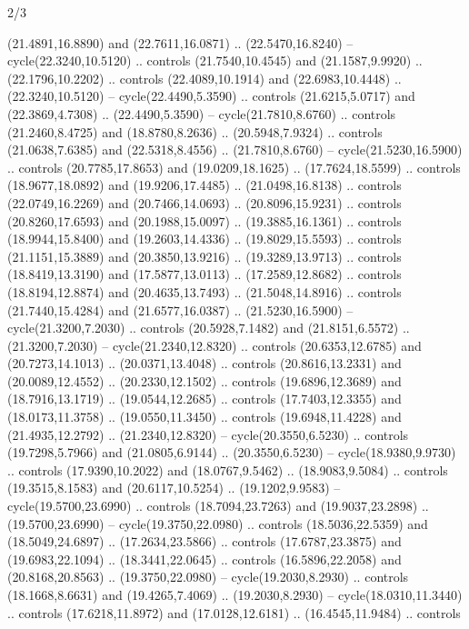 \begin{flagdescription}{2/3}
\begin{scope}[yshift=\flagwidth,scale=\flagwidth/1241.93737]
\begin{scope}[y=-1mm, x=1mm,draw=gold,fill=blue,line join=miter,miter limit=4,line width=1.8\lw]
\begin{scope}[y=1mm, x=1mm, yscale=-1,shift={(573.68mm+\str,145.75)}]
\begin{scope}[scale=1.35,shift={(-9,-3)}]
\begin{scope}[scale=0.55]
\begin{scope}[scale=1.333]
    (21.4891,16.8890) and (22.7611,16.0871) .. (22.5470,16.8240) --
    cycle(22.3240,10.5120) .. controls (21.7540,10.4545) and (21.1587,9.9920) ..
    (22.1796,10.2202) .. controls (22.4089,10.1914) and (22.6983,10.4448) ..
    (22.3240,10.5120) -- cycle(22.4490,5.3590) .. controls (21.6215,5.0717) and
    (22.3869,4.7308) .. (22.4490,5.3590) -- cycle(21.7810,8.6760) .. controls
    (21.2460,8.4725) and (18.8780,8.2636) .. (20.5948,7.9324) .. controls
    (21.0638,7.6385) and (22.5318,8.4556) .. (21.7810,8.6760) --
    cycle(21.5230,16.5900) .. controls (20.7785,17.8653) and (19.0209,18.1625) ..
    (17.7624,18.5599) .. controls (18.9677,18.0892) and (19.9206,17.4485) ..
    (21.0498,16.8138) .. controls (22.0749,16.2269) and (20.7466,14.0693) ..
    (20.8096,15.9231) .. controls (20.8260,17.6593) and (20.1988,15.0097) ..
    (19.3885,16.1361) .. controls (18.9944,15.8400) and (19.2603,14.4336) ..
    (19.8029,15.5593) .. controls (21.1151,15.3889) and (20.3850,13.9216) ..
    (19.3289,13.9713) .. controls (18.8419,13.3190) and (17.5877,13.0113) ..
    (17.2589,12.8682) .. controls (18.8194,12.8874) and (20.4635,13.7493) ..
    (21.5048,14.8916) .. controls (21.7440,15.4284) and (21.6577,16.0387) ..
    (21.5230,16.5900) -- cycle(21.3200,7.2030) .. controls (20.5928,7.1482) and
    (21.8151,6.5572) .. (21.3200,7.2030) -- cycle(21.2340,12.8320) .. controls
    (20.6353,12.6785) and (20.7273,14.1013) .. (20.0371,13.4048) .. controls
    (20.8616,13.2331) and (20.0089,12.4552) .. (20.2330,12.1502) .. controls
    (19.6896,12.3689) and (18.7916,13.1719) .. (19.0544,12.2685) .. controls
    (17.7403,12.3355) and (18.0173,11.3758) .. (19.0550,11.3450) .. controls
    (19.6948,11.4228) and (21.4935,12.2792) .. (21.2340,12.8320) --
    cycle(20.3550,6.5230) .. controls (19.7298,5.7966) and (21.0805,6.9144) ..
    (20.3550,6.5230) -- cycle(18.9380,9.9730) .. controls (17.9390,10.2022) and
    (18.0767,9.5462) .. (18.9083,9.5084) .. controls (19.3515,8.1583) and
    (20.6117,10.5254) .. (19.1202,9.9583) -- cycle(19.5700,23.6990) .. controls
    (18.7094,23.7263) and (19.9037,23.2898) .. (19.5700,23.6990) --
    cycle(19.3750,22.0980) .. controls (18.5036,22.5359) and (18.5049,24.6897) ..
    (17.2634,23.5866) .. controls (17.6787,23.3875) and (19.6983,22.1094) ..
    (18.3441,22.0645) .. controls (16.5896,22.2058) and (20.8168,20.8563) ..
    (19.3750,22.0980) -- cycle(19.2030,8.2930) .. controls (18.1668,8.6631) and
    (19.4265,7.4069) .. (19.2030,8.2930) -- cycle(18.0310,11.3440) .. controls
    (17.6218,11.8972) and (17.0128,12.6181) .. (16.4545,11.9484) .. controls

\end{scope}
\end{scope}
\end{scope}
\end{scope}
\end{scope}
\end{scope}
\end{flagdescription}
